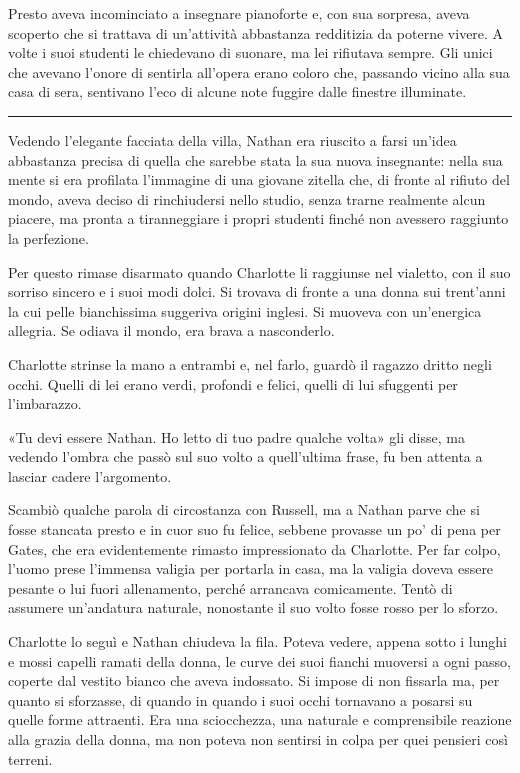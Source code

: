 \documentclass[a4paper,oneside,11pt]{memoir}
\begin{document}
Presto aveva incominciato a insegnare pianoforte e, con sua sorpresa, aveva scoperto che si trattava di un'attività
abbastanza redditizia da poterne vivere. A volte i suoi studenti le chiedevano di suonare, ma lei rifiutava sempre. Gli
unici che avevano l'onore di sentirla all'opera erano coloro che, passando vicino alla sua casa di sera, sentivano l'eco
di alcune note fuggire dalle finestre illuminate.

\plainbreak{1}

Vedendo l'elegante facciata della villa, Nathan era riuscito a farsi un'idea abbastanza precisa di quella che sarebbe
stata la sua nuova insegnante: nella sua mente si era profilata l'immagine di una giovane zitella che, di fronte al
rifiuto del mondo, aveva deciso di rinchiudersi nello studio, senza trarne realmente alcun piacere, ma pronta a
tiranneggiare i propri studenti finché non avessero raggiunto la perfezione.

Per questo rimase disarmato quando Charlotte li raggiunse nel vialetto, con il suo sorriso sincero e i suoi modi dolci.
Si trovava di fronte a una donna sui trent'anni la cui pelle bianchissima suggeriva origini inglesi. Si muoveva con
un'energica allegria. Se odiava il mondo, era brava a nasconderlo.

Charlotte strinse la mano a entrambi e, nel farlo, guardò il ragazzo dritto negli occhi. Quelli di lei erano verdi,
profondi e felici, quelli di lui sfuggenti per l'imbarazzo.

«Tu devi essere Nathan. Ho letto di tuo padre qualche volta» gli disse, ma vedendo l'ombra che passò sul suo volto a
quell'ultima frase, fu ben attenta a lasciar cadere l'argomento.

Scambiò qualche parola di circostanza con Russell, ma a Nathan parve che si fosse stancata presto e in cuor suo fu
felice, sebbene provasse un po' di pena per Gates, che era evidentemente rimasto impressionato da Charlotte. Per far
colpo, l'uomo prese l'immensa valigia per portarla in casa, ma la valigia doveva essere pesante o lui fuori allenamento,
perché arrancava comicamente. Tentò di assumere un'andatura naturale, nonostante il suo volto fosse rosso per lo sforzo.

Charlotte lo seguì e Nathan chiudeva la fila. Poteva vedere, appena sotto i lunghi e mossi capelli ramati della donna,
le curve dei suoi fianchi muoversi a ogni passo, coperte dal vestito bianco che aveva indossato. Si impose di non
fissarla ma, per quanto si sforzasse, di quando in quando i suoi occhi tornavano a posarsi su quelle forme attraenti.
Era una sciocchezza, una naturale e comprensibile reazione alla grazia della donna, ma non poteva non sentirsi in colpa
per quei pensieri così terreni.
\end{document}

